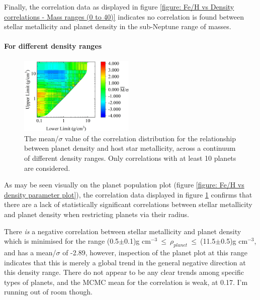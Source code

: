 \documentclass[a4paper,twocolumn,12pt]{article}
\begin{document}
Finally, the correlation data as displayed in figure \ref{figure: Fe/H vs Density correlations - Mass ranges (0 to 40)} indicates no correlation is found between stellar metallicity and planet density in the sub-Neptune range of masses.






\paragraph{For different density ranges}
\vspace{-1.0em}

\begin{figure}[h!]
    \centering
    \includegraphics[width=0.49\textwidth]{Graphs/FeH vs Density correlations - Density ranges.png}
    \caption{The mean/$\sigma$ value of the correlation distribution for the relationship between planet density and host star metallicity, across a continuum of different density ranges. Only correlations with at least 10 planets are considered.}
    \label{figure: Fe/H vs Density correlations - Density ranges (All)}
\end{figure}


As may be seen visually on the planet population plot (figure \ref{figure: Fe/H vs density parameter plot}), the correlation data displayed in figure \ref{figure: Fe/H vs Density correlations - Density ranges (All)} confirms that there are a lack of statistically significant correlations between stellar metallicity and planet density when restricting planets via their radius.

There \textit{is} a negative correlation between stellar metallicity and planet density which is minimised for the range (0.5$\pm$0.1)g cm$^{-3}~\leq~\rho_{planet}~\leq~$(11.5$\pm$0.5)g cm$^{-3}$, and has a mean/$\sigma$ of -2.89, however, inspection of the planet plot at this range indicates that this is merely a global trend in the general negative direction at this density range. There do not appear to be any clear trends among specific types of planets, and the MCMC mean for the correlation is weak, at 0.17.
I'm running out of room though.
\end{document}
